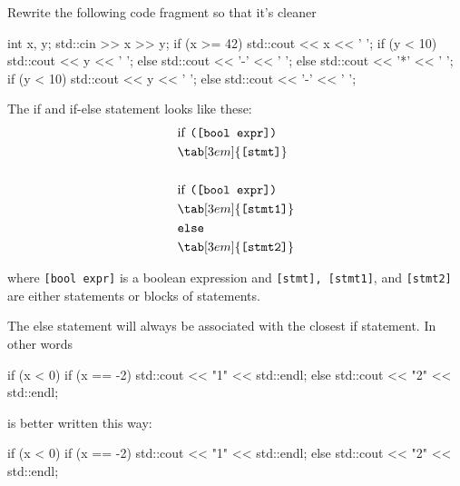 \begin{ex}
Rewrite the following code fragment so that it's
cleaner
\begin{console}
int x, y;
std::cin >> x >> y;
if (x >= 42)
{
    std::cout << x << ' ';
    if (y < 10)
    {
        std::cout << y << ' ';
    }
    else
    {
        std::cout << '-' << ' ';
    }
}
else
{
     std::cout << '*' << ' ';
     if (y < 10)
     {
        std::cout << y << ' ';
     }
     else
     {
        std::cout << '-' << ' ';
     }
}
\end{console}
\end{ex}

\newpage{}

The if and if-else statement looks like these:
\begin{align*}
&\text{if \texttt{([bool expr])}}\\
&\tab[3em]{\texttt{[stmt]}}\\\\
&\text{if \texttt{([bool expr])}}\\
&\tab[3em]{\texttt{[stmt1]}}\\
&\texttt{else}\\
&\tab[3em]{\texttt{[stmt2]}}\\
\end{align*}

where \texttt{[bool expr]} is a boolean expression and
\texttt{[stmt], [stmt1]}, and \texttt{[stmt2]} are either
statements or blocks of statements.

The else statement will always be associated with the closest if
statement. In other words
\begin{console}
if (x < 0)
   if (x == -2) std::cout << "1" << std::endl;
else
      std::cout << "2" << std::endl;
\end{console}

is better written this way:
\begin{console}
if (x < 0)
   if (x == -2)
       std::cout << "1" << std::endl;
   else
       std::cout << "2" << std::endl;
\end{console}

